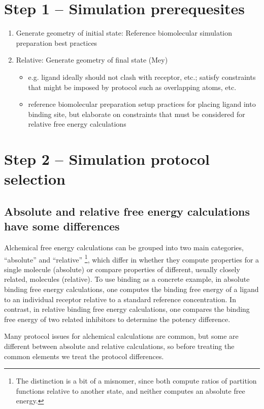 \documentclass[9pt,bestpractices]{livecoms}
\begin{document}
\section{Step 1 -- Simulation prerequesites}
\label{sec:step1}
\begin{enumerate}
\item Generate geometry of initial state: Reference biomolecular simulation preparation best practices
\item Relative: Generate geometry of final state (Mey)
\begin{itemize}
\item e.g. ligand ideally should not clash with receptor, etc.; satisfy constraints that might be imposed by protocol such as overlapping atoms, etc.
\item reference biomolecular preparation setup practices for placing ligand into binding site, but elaborate on constraints that must be considered for relative free energy calculations
\end{itemize}
\end{enumerate}

\section{Step 2 -- Simulation protocol selection}
\label{sec:step2}

\subsection{Absolute and relative free energy calculations have some differences}

Alchemical free energy calculations can be grouped into two main categories, ``absolute'' and ``relative'' \footnote{The distinction is a bit of a misnomer, since both compute ratios of partition functions relative to another state, and neither computes an absolute free energy.}, which differ in whether they compute properties for a single molecule (absolute) or compare properties of different, usually closely related, molecules (relative).
To use binding as a concrete example, in absolute binding free energy calculations, one computes the binding free energy of a ligand to an individual receptor relative to a standard reference concentration.
In contrast, in relative binding free energy calculations, one compares the binding free energy of two related inhibitors to determine the potency difference.

Many protocol issues for alchemical calculations are common, but some are different between absolute and relative calculations, so before treating the common elements we treat the protocol differences.
\end{document}

